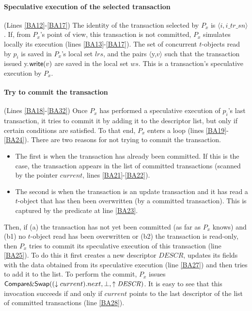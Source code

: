\paragraph{Speculative execution of the selected  transaction} 
(Lines \ref{BA12}-\ref{BA17}) 
The identity of the transaction selected by $P_x$ is 
$\langle i,  i\_tr\_sn \rangle$. 
If,  from $P_x$'s point of view, this transaction  is not committed, $P_x$ 
simulates locally its execution (lines \ref{BA13}-\ref{BA17}).
The set of concurrent $t$-objects read by $p_i$ is  saved in $P_x$'s local
set $\mathit{lrs}$, and the  pairs $\langle${\sc y},$v\rangle$ 
such that the transaction issued {\sc y}.${\sf write}(v)$ are saved in 
the local set $ws$. This is a transaction's speculative execution by $P_x$. 

\paragraph{Try to commit the transaction}
 (Lines \ref{BA18}-\ref{BA32}) Once $P_x$ has performed a speculative
 execution of $p_i$'s  last transaction, it tries to commit  it by adding it
to the descriptor list, but only if certain conditions are satisfied.
To that end, $P_x$  enters a loop (lines \ref{BA19}-\ref{BA24}). 
There are two reasons for not trying to commit the transaction.
%
\begin{itemize}
\item
The first is when  the transaction has already  been committed. 
If this is the case, the transaction  appears in the list of committed 
transactions (scanned by the pointer $current$, lines \ref{BA21}-\ref{BA22}).
%
\item
The second is when the transaction is an update transaction and it
has read a $t$-object that  has then been overwritten (by a committed 
transaction). This is  captured by the predicate at line \ref{BA23}.
\end{itemize}

Then, if (a) the  transaction has not yet been  committed 
(as far as $P_x$ knows) and (b1) no $t$-object read has been overwritten  or 
(b2) the transaction is read-only, then $P_x$ tries to
commit its speculative execution of this transaction (line \ref{BA25}).
To do this it first creates a new descriptor $\mathit{DESCR}$,
updates its fields  with the data obtained from its speculative execution
 (line \ref{BA27}) and then tries to add it to the list. 
%
To perform  the commit, $P_x$ issues ${\sf Compare\&Swap}
((\downarrow current).next,\bot,\uparrow \mathit{DESCR})$.
It is easy to see that this invocation succeeds if and only if $current$ 
points to the last  descriptor of the list of committed transactions 
(line \ref{BA28}).


